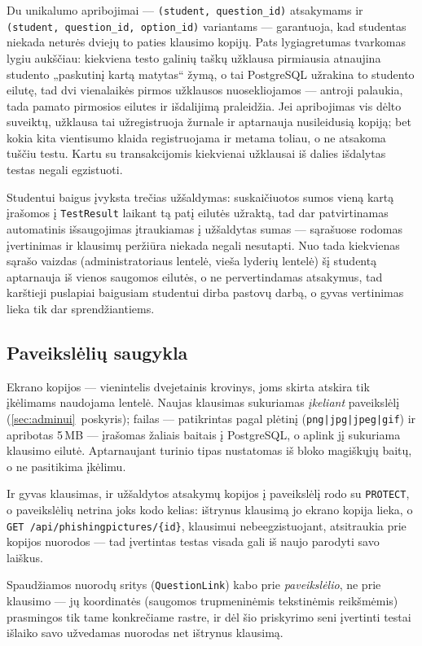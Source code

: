 \documentclass[11pt,a4paper]{article}
\newcommand{\code}[1]{\texttt{#1}}
\begin{document}
Du unikalumo apribojimai — \code{(student, question\_id)} atsakymams
ir \code{(student, question\_id, option\_id)} variantams —
garantuoja, kad studentas niekada neturės dviejų to paties klausimo
kopijų. Pats lygiagretumas tvarkomas lygiu aukščiau: kiekviena testo
galinių taškų užklausa pirmiausia atnaujina studento „paskutinį kartą
matytas`` žymą, o tai PostgreSQL užrakina to studento eilutę, tad dvi
vienalaikės pirmos užklausos nuosekliojamos — antroji palaukia, tada
pamato pirmosios eilutes ir išdalijimą praleidžia. Jei apribojimas vis
dėlto suveiktų, užklausa tai užregistruoja žurnale ir aptarnauja
nusileidusią kopiją; bet kokia kita vientisumo klaida registruojama ir
metama toliau, o ne atsakoma tuščiu testu. Kartu su transakcijomis
kiekvienai užklausai iš dalies išdalytas testas negali egzistuoti.

Studentui baigus įvyksta trečias užšaldymas: suskaičiuotos sumos
vieną kartą įrašomos į \code{TestResult} laikant tą patį eilutės
užraktą, tad dar patvirtinamas automatinis išsaugojimas įtraukiamas į
užšaldytas sumas — sąrašuose rodomas įvertinimas ir klausimų peržiūra
niekada negali nesutapti. Nuo tada kiekvienas sąrašo vaizdas
(administratoriaus lentelė, vieša lyderių lentelė) šį studentą
aptarnauja iš vienos saugomos eilutės, o ne pervertindamas atsakymus,
tad karštieji puslapiai baigusiam studentui dirba pastovų darbą, o
gyvas vertinimas lieka tik dar sprendžiantiems.

\subsection{Paveikslėlių saugykla}

Ekrano kopijos — vienintelis dvejetainis krovinys, joms skirta atskira
tik įkėlimams naudojama lentelė. Naujas klausimas sukuriamas
\emph{įkeliant} paveikslėlį (\ref{sec:adminui}~poskyris); failas —
patikrintas pagal plėtinį (\code{png|jpg|jpeg|gif}) ir apribotas
5\,MB — įrašomas žaliais baitais į PostgreSQL, o aplink jį sukuriama
klausimo eilutė. Aptarnaujant turinio tipas nustatomas iš bloko
magiškųjų baitų, o ne pasitikima įkėlimu.

Ir gyvas klausimas, ir užšaldytos atsakymų kopijos į paveikslėlį rodo
su \code{PROTECT}, o paveikslėlių netrina joks kodo kelias: ištrynus
klausimą jo ekrano kopija lieka, o
\code{GET /api/phishingpictures/\{id\}}, klausimui nebeegzistuojant,
atsitraukia prie kopijos nuorodos — tad įvertintas testas visada gali
iš naujo parodyti savo laiškus.

Spaudžiamos nuorodų sritys (\code{QuestionLink}) kabo prie
\emph{paveikslėlio}, ne prie klausimo — jų koordinatės (saugomos
trupmeninėmis tekstinėmis reikšmėmis) prasmingos tik tame konkrečiame
rastre, ir dėl šio priskyrimo seni įvertinti testai išlaiko savo
užvedamas nuorodas net ištrynus klausimą.
\end{document}
